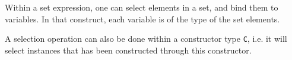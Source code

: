 \documentclass[11pt]{report}
\begin{document}
Within a set expression, one can select elements in a set, and bind them to variables. In that construct, each variable is of the type of the set elements.

\begin{center}
 
\DP
\end{center}

A selection operation can also be done within a constructor type \texttt{C}, i.e. it will select instances that has been constructed through this constructor.

\begin{center}
\DP
\end{center}

\end{document}
